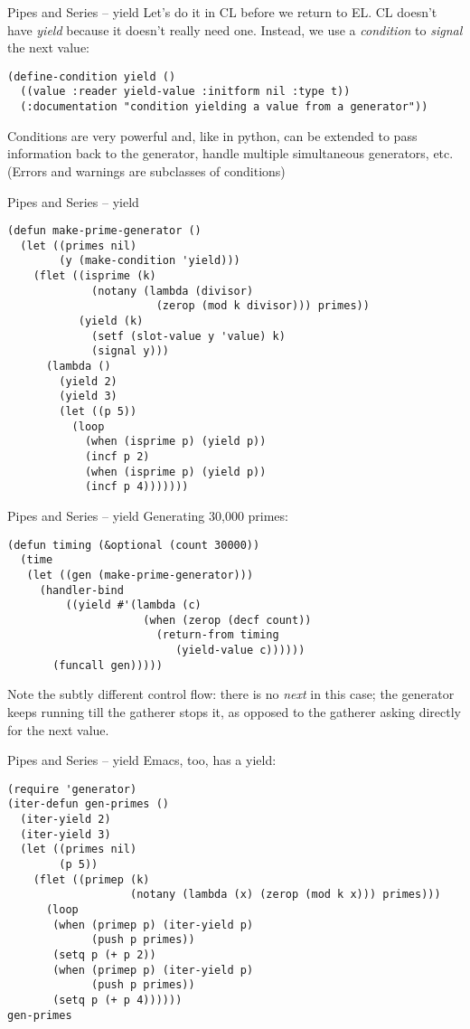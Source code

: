\documentclass[presentation]{beamer}
\begin{document}
\begin{frame}[fragile]{Pipes and Series -- yield}
Let's do it in CL before we return to EL.  CL doesn't have \emph{yield} because it doesn't really need one.  Instead, we use a \emph{condition} to \emph{signal} the next value:
\begin{verbatim}
(define-condition yield ()
  ((value :reader yield-value :initform nil :type t))
  (:documentation "condition yielding a value from a generator"))
\end{verbatim}

\medskip
Conditions are very powerful and, like in python, can be extended to pass information back to the generator, handle multiple simultaneous generators, etc.  (Errors and warnings are subclasses of conditions)
\end{frame}

\begin{frame}[fragile]{Pipes and Series -- yield}
\begin{verbatim}
(defun make-prime-generator ()
  (let ((primes nil)
        (y (make-condition 'yield)))
    (flet ((isprime (k)
             (notany (lambda (divisor)
                       (zerop (mod k divisor))) primes))
           (yield (k)
             (setf (slot-value y 'value) k)
             (signal y)))
      (lambda ()
        (yield 2)
        (yield 3)
        (let ((p 5))
          (loop
            (when (isprime p) (yield p))
            (incf p 2)
            (when (isprime p) (yield p))
            (incf p 4)))))))
\end{verbatim}
\end{frame}

\begin{frame}[fragile]{Pipes and Series -- yield}
Generating 30,000 primes:
\begin{verbatim}
(defun timing (&optional (count 30000))
  (time
   (let ((gen (make-prime-generator)))
     (handler-bind
         ((yield #'(lambda (c)
                     (when (zerop (decf count))
                       (return-from timing
                          (yield-value c))))))
       (funcall gen)))))
\end{verbatim}

\medskip
Note the subtly different control flow: there is no \emph{next} in this case; the generator keeps running till the gatherer stops it, as opposed to the gatherer asking directly for the next value.
\end{frame}

\begin{frame}[fragile]{Pipes and Series -- yield}
  Emacs, too, has a yield:
\begin{verbatim}
(require 'generator)
(iter-defun gen-primes ()
  (iter-yield 2)
  (iter-yield 3)
  (let ((primes nil)
        (p 5))
    (flet ((primep (k)
                   (notany (lambda (x) (zerop (mod k x))) primes)))
      (loop
       (when (primep p) (iter-yield p)
             (push p primes))
       (setq p (+ p 2))
       (when (primep p) (iter-yield p)
             (push p primes))
       (setq p (+ p 4))))))
gen-primes
\end{verbatim}
\end{frame}
\end{document}
